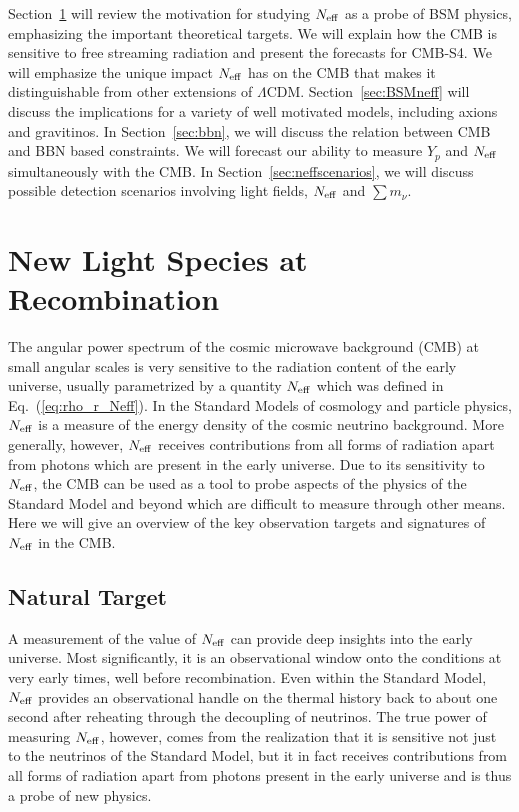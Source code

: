 Section~\ref{sec:Neff} will review the motivation for studying $N_{\rm eff}$ as a probe of BSM physics, emphasizing the important theoretical targets.  We will explain how the CMB is sensitive to free streaming radiation and present the forecasts for CMB-S4.  We will emphasize the unique impact $N_{\rm eff}$ has on the CMB that makes it distinguishable from other extensions of $\Lambda$CDM.   Section~\ref{sec:BSMneff} will discuss the implications for a variety of well motivated models, including axions and gravitinos.  In Section~\ref{sec:bbn}, we will discuss the relation between CMB and BBN based constraints.  We will forecast our ability to measure $Y_p$ and $N_{\rm eff}$ simultaneously with the CMB.  In Section~\ref{sec:neffscenarios}, we will discuss possible detection scenarios involving light fields, $N_{\rm eff}$ and $\sum m_\nu$.


\section{New Light Species at Recombination}\label{sec:Neff}


The angular power spectrum of the cosmic microwave background (CMB) at small angular scales is very sensitive to the radiation content of the early universe, usually parametrized by a quantity $N_{\rm eff}$ which was defined in Eq.~(\ref{eq:rho_r_Neff}).  In the Standard Models of cosmology and particle physics, $N_{\rm eff}$ is a measure of the energy density of the cosmic neutrino background.  More generally, however, $N_{\rm eff}$ receives contributions from all forms of radiation apart from photons which are present in the early universe.  Due to its sensitivity to $N_{\rm eff}$, the CMB can be used as a tool to probe aspects of the physics of the Standard Model and beyond which are difficult to measure through other means.  Here we will give an overview of the key observation targets and signatures of $N_{\rm eff}$ in the CMB.  






\subsection{Natural Target}

A measurement of the value of $N_{\rm eff}$ can provide deep insights into the early universe.  Most significantly, it is an observational window onto the conditions at very early times, well before recombination.  Even within the Standard Model, $N_{\rm eff}$ provides an observational handle on the thermal history back to about one second after reheating through the decoupling of neutrinos.  The true power of measuring $N_{\rm eff}$, however, comes from the realization that it is sensitive not just to the neutrinos of the Standard Model, but it in fact receives contributions from all forms of radiation apart from photons present in the early universe and is thus a probe of new physics.

